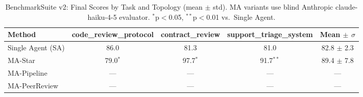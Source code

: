 \begin{table}[h]
\centering
\caption{BenchmarkSuite v2: Final Scores by Task and Topology (mean $\pm$ std). 
MA variants use blind Anthropic claude-haiku-4-5 evaluator. $^*$p$<$0.05, $^{**}$p$<$0.01 vs.\ Single Agent.}
\label{tab:benchmark_v2}
\begin{tabular}{lcccc}
\toprule
Method & code_review_protocol & contract_review & support_triage_system & Mean $\pm$ $\sigma$ \\
\midrule
Single Agent (SA) & 86.0 & 81.3 & 81.0 & 82.8 $\pm$ 2.3 \\
MA-Star & 79.0$^{*}$ & 97.7$^{*}$ & 91.7$^{**}$ & 89.4 $\pm$ 7.8 \\
MA-Pipeline & — & — & — & — \\
MA-PeerReview & — & — & — & — \\
\bottomrule
\end{tabular}
\end{table}